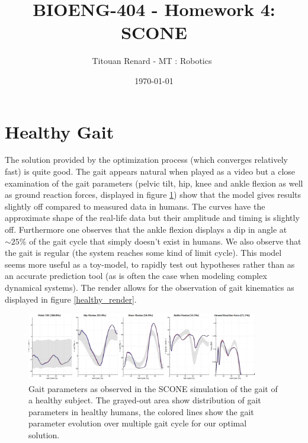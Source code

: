 \documentclass[11pt]{article}
\title{BIOENG-404 - Homework 4: SCONE}
\author{
    Titouan Renard
    - MT : Robotics 
}
\date{\today}
\begin{document}
\maketitle

\section{Healthy Gait}

The solution provided by the optimization process (which converges relatively fast) is quite good. The gait appears natural when played as a video but a close examination of the gait parameters (pelvic tilt, hip, knee and ankle flexion as well as ground reaction forces, displayed in figure \ref{healthy_gait}) show that the model gives results slightly off compared to measured data in humans. The curves have the approximate shape of the real-life data but their amplitude and timing is slightly off. Furthermore one observes that the ankle flexion displays a dip in angle at $\sim 25\%$ of the gait cycle that simply doesn't exist in humans. We also observe that the gait is regular (the system reaches some kind of limit cycle). This model seems more useful as a toy-model, to rapidly test out hypotheses rather than as an accurate prediction tool (as is often the case when modeling complex dynamical systems). The render allows for the observation of gait kinematics as displayed in figure \ref{healthy_render}.

\begin{figure}[h!]
    \centering
    \includegraphics[width=0.9\textwidth]{screens/healthy_gait.png}
    \caption{Gait parameters as observed in the SCONE simulation of the gait of a healthy subject. The grayed-out area show distribution of gait parameters in healthy humans, the colored lines show the gait parameter evolution over multiple gait cycle for our optimal solution.}
    \label{healthy_gait}
\end{figure}
\end{document}
